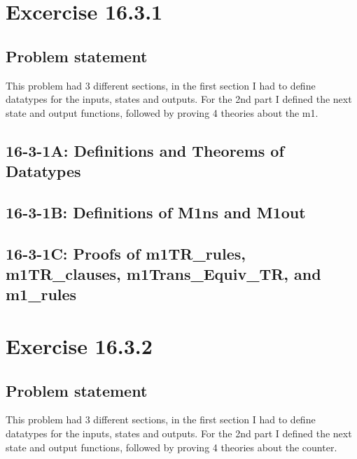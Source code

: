 \documentclass{report}
\begin{document}
\chapter{Excercise 16.3.1}
\label{cha:16-3-1}

\section{Problem statement}
\label{problem-statement-16-3-1}
This problem had 3 different sections, in the first section I had to
define datatypes for the inputs, states and outputs. For the 2nd part
I defined the next state and output functions, followed by proving 4
theories about the m1.

\section{16-3-1A: Definitions and Theorems of Datatypes}
\label{defs-16-3-1-A}




\section{16-3-1B: Definitions of M1ns and M1out}
\label{defs-16-3-1-B}




\section{16-3-1C: Proofs of m1TR_rules, m1TR_clauses, m1Trans_Equiv_TR, and m1_rules}
\label{proofs-16-3-1-C}




\chapter{Exercise 16.3.2}
\label{cha:16-3-2}

\section{Problem statement}
\label{problem-statement-16-3-2}
This problem had 3 different sections, in the first section I had to
define datatypes for the inputs, states and outputs. For the 2nd part
I defined the next state and output functions, followed by proving 4
theories about the counter.
\end{document}
